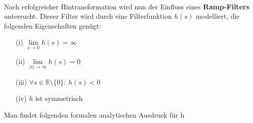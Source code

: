         \ \\
        Nach erfolgreicher Hintransformation wird nun der Einfluss eines \textbf{Ramp-Filters} untersucht. Dieser Filter wird durch eine Filterfunktion $h(s)$ modelliert, die folgenden Eigenschaften genügt:
        \begin{itemize}
        		\item[(i)] $\lim\limits_{s\rightarrow 0}h(s) = \infty$
        		\item[(ii)] $\lim\limits_{|s|\rightarrow \infty}h(s) = 0$
        		\item[(iii)] $\forall s \in \mathbb{R}\setminus\{0\}:\ h(s) < 0$
        		\item[(iv)] $h$ ist symmetrisch
        \end{itemize}
        Man findet folgenden formalen analytischen Ausdruck für h\cite{Ramp}
        
